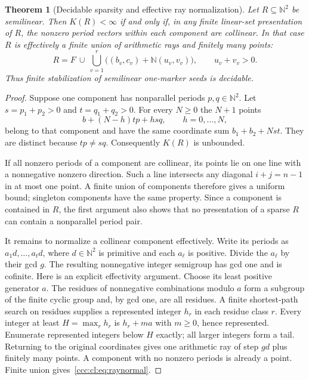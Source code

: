 \documentclass[11pt,letterpaper]{article}
\newtheorem{theorem}{Theorem}[section]
\theoremstyle{definition}
\theoremstyle{remark}
\newcommand{\N}{\mathbb N}
\begin{document}
\begin{theorem}[Decidable sparsity and effective ray normalization]
\label{ccc:cl:thm:sparsity}
Let $R\subseteq\N^2$ be semilinear. Then $K(R)<\infty$ if and only if,
in any finite linear-set presentation of $R$, the nonzero period vectors
within each component are collinear. In that case $R$ is effectively a
finite union of arithmetic rays and finitely many points:
\begin{equation}\label{ccc:cl:eq:raynormal}
 R=F\ \cup\ \bigcup_{v=1}^r
       \bigl((b_v,c_v)+\N(u_v,v_v)\bigr),
 \qquad u_v+v_v>0.
\end{equation}
Thus finite stabilization of semilinear one-marker seeds is decidable.
\end{theorem}
\begin{proof}
Suppose one component has nonparallel periods $p,q\in\N^2$.
Let $s=p_1+p_2>0$ and $t=q_1+q_2>0$. For every $N\ge0$ the $N+1$ points
\[
 b+(N-h)t p+h s q,\qquad h=0,\ldots,N,
\]
belong to that component and have the same coordinate sum
$b_1+b_2+Nst$. They are distinct because $tp\ne sq$.
Consequently $K(R)$ is unbounded.

If all nonzero periods of a component are collinear, its points lie on
one line with a nonnegative nonzero direction. Such a line intersects
any diagonal $i+j=n-1$ in at most one point. A finite union of components
therefore gives a uniform bound; singleton components have the same
property. Since a component is contained in $R$, the first argument also
shows that no presentation of a sparse $R$ can contain a nonparallel
period pair.

It remains to normalize a collinear component effectively. Write its
periods as $a_1d,\ldots,a_td$, where $d\in\N^2$ is primitive and each
$a_\ell$ is positive. Divide the $a_\ell$ by their gcd $g$.
The resulting nonnegative integer semigroup has gcd one and is cofinite.
Here is an explicit effectivity argument. Choose its least positive
generator $a$. The residues of nonnegative combinations modulo $a$ form
a subgroup of the finite cyclic group and, by gcd one, are all residues.
A finite shortest-path search on residues supplies a represented integer
$h_r$ in each residue class $r$. Every integer at least
$H=\max_r h_r$ is $h_r+ma$ with $m\ge0$, hence represented.
Enumerate represented integers below $H$ exactly; all larger integers
form a tail. Returning to the original coordinates gives one arithmetic
ray of step $gd$ plus finitely many points. A component with no nonzero
periods is already a point. Finite union gives~\eqref{ccc:cl:eq:raynormal}.
\end{proof}
\end{document}
